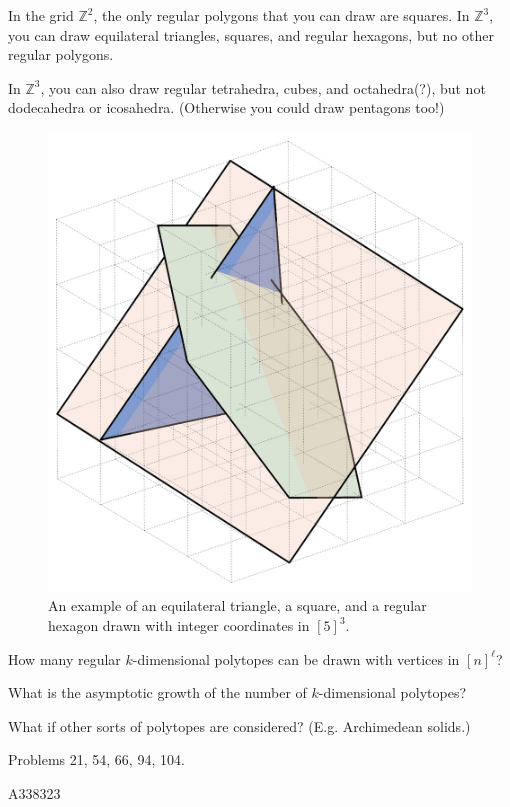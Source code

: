 \documentclass{article}
\begin{document}
In the grid $\mathbb Z^2$, the only regular polygons that you can draw are
squares. In $\mathbb Z^3$, you can draw equilateral triangles, squares, and
regular hexagons, but no other regular polygons.

In $\mathbb Z^3$, you can also draw regular tetrahedra, cubes, and octahedra(?),
but not dodecahedra or icosahedra. (Otherwise you could draw pentagons too!)
\begin{figure}[ht!]
  \centering
  \includegraphics[scale=0.18]{assets/116_problem/polygons_in_grid_3.png}
  \caption{
    An example of an equilateral triangle, a square, and a regular hexagon
    drawn with integer coordinates in $[5]^3$.
  }
\end{figure}

\begin{question}
  How many regular $k$-dimensional polytopes can be drawn with vertices in $[n]^\ell$?
\end{question}

\begin{related}
  \item What is the asymptotic growth of the number of $k$-dimensional polytopes?
  \item What if other sorts of polytopes are considered? (E.g. Archimedean solids.)
\end{related}

\begin{references}
  \item Problems 21, 54, 66, 94, 104.
  \item A338323
\end{references}
\end{document}
